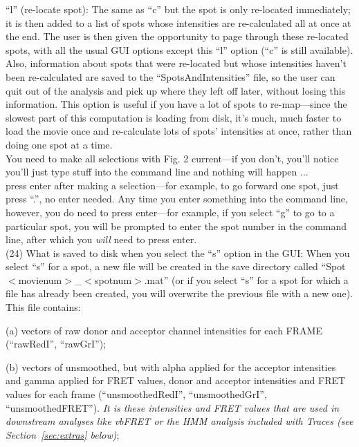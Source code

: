 \documentclass[11pt]{article}
\begin{document}
``l'' (re-locate spot): The same as ``c'' but the spot is only re-located immediately; it is then added to a list of spots whose intensities are re-calculated all at once at the end.  The user is then given the opportunity to page through these re-located spots, with all the usual GUI options except this ``l'' option (``c'' is still available).  Also, information about spots that were re-located but whose intensities haven't been re-calculated are saved to the ``SpotsAndIntensities'' file, so the user can quit out of the analysis and pick up where they left off later, without losing this information.  This option is useful if you have a lot of spots to re-map---since the slowest part of this computation is loading from disk, it's much, much faster to load the movie once and re-calculate lots of spots' intensities at once, rather than doing one spot at a time.\\

\noindent You need to make all selections with Fig. 2 current---if you don't, you'll notice you'll just type stuff into the command line and nothing will happen ...\\

 press enter after making a selection---for example, to go forward one spot, just press ``.'', no enter needed.  Any time you enter something into the command line, however, you do need to press enter---for example, if you select ``g'' to go to a particular spot, you will be prompted to enter the spot number in the command line, after which you {\it will} need to press enter. \\

\noindent (24) What is saved to disk when you select the ``s''  option in the GUI: When you select ``s'' for a spot, a new file will be created in the save directory called ``Spot$<$movienum$>$\_$<$spotnum$>$.mat'' (or if you select ``s'' for a spot for which a file has already been created, you will overwrite the previous file with a new one).  This file contains: 

(a) vectors of raw donor and acceptor channel intensities for each FRAME (``rawRedI'', ``rawGrI''); 

(b) vectors of unsmoothed, but with alpha applied for the acceptor intensities and gamma applied for FRET values, donor and acceptor intensities and FRET values for each frame (``unsmoothedRedI'', ``unsmoothedGrI'', ``unsmoothedFRET''). {\it It is these intensities and FRET values that are used in downstream analyses like vbFRET \cite{Bronson2009} or the HMM analysis included with Traces (see Section~\ref{sec:extras} below)};
\end{document}
